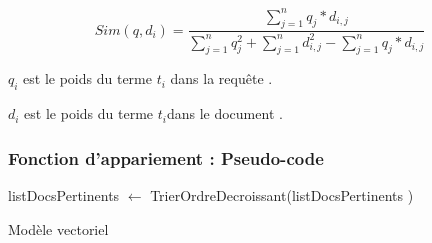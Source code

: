 \documentclass[12pt,a4paper,oneside]{article}
\begin{document}
\[
Sim(q,d_i) = \frac{\sum_{j=1}^{n} q_{j} * d_{i,j}}
{\sum_{j=1}^{n} q_{j}^2 + \sum_{j=1}^{n} d_{i,j}^2 - \sum_{j=1}^{n} q_{j} * d_{i,j}}
\]


$q_{i}$ est le poids du terme $t_{i}$ dans la requête .

$d_{i}$ est le poids du terme $t_{i} $dans le document .
\subsubsection*{Fonction d'appariement : Pseudo-code} 
\begin{algorithm}[H]
	\DontPrintSemicolon
	
	
	
	
	
	
	
	
	
	listDocsPertinents $\gets$ TrierOrdreDecroissant(listDocsPertinents
	)
	
	
	\caption{{\sc Modèle vectoriel}}
	\label{algo:duplicate2}
\end{algorithm}
\end{document}

